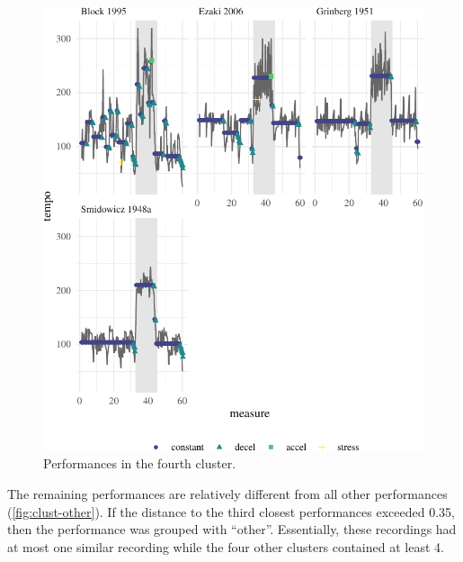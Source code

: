 \documentclass[aoas]{aoas/imsart}
\begin{document}
\begin{figure}

{\centering \includegraphics{gfx/clust-4-1} 

}

\caption{Performances in the fourth cluster.}\label{fig:clust-4}
\end{figure}

The remaining performances are relatively different from all other
performances (\autoref{fig:clust-other}). If the distance to the third
closest performances exceeded 0.35, then the performance was grouped
with ``other''. Essentially, these recordings had at most one similar
recording while the four other clusters contained at least 4.
\end{document}
